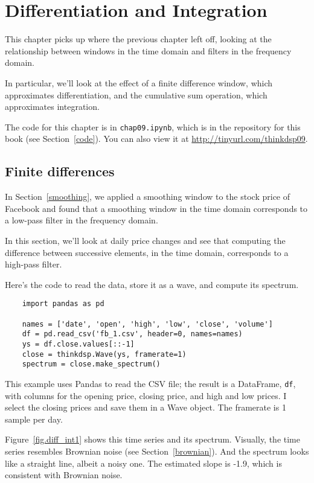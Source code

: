 \chapter{Differentiation and Integration}
\label{diffint}

This chapter picks up where the previous chapter left off,
looking at the relationship between windows in the time domain
and filters in the frequency domain.

In particular, we'll look at the effect of a finite difference
window, which approximates differentiation, and the cumulative
sum operation, which approximates integration.

The code for this chapter is in {\tt chap09.ipynb}, which is in the
repository for this book (see Section~\ref{code}).
You can also view it at \url{http://tinyurl.com/thinkdsp09}.


\section{Finite differences}
\label{diffs}

In Section~\ref{smoothing}, we applied a smoothing window to
the stock price of Facebook and found that a smoothing
window in the time domain corresponds to a low-pass filter in
the frequency domain.

In this section, we'll look at daily price changes and
see that computing the difference between successive elements,
in the time domain, corresponds to a high-pass filter.

Here's the code to read the data, store it as a wave, and compute its
spectrum.

\begin{verbatim}
	import pandas as pd
	
	names = ['date', 'open', 'high', 'low', 'close', 'volume']
	df = pd.read_csv('fb_1.csv', header=0, names=names)
	ys = df.close.values[::-1]
	close = thinkdsp.Wave(ys, framerate=1)
	spectrum = close.make_spectrum()
\end{verbatim}

This example uses Pandas to read the CSV file; the
result is a DataFrame, {\tt df}, with columns for the opening
price, closing price, and high and low prices.  I select the closing
prices and save them in a Wave object.
The framerate is 1 sample per day.

Figure~\ref{fig.diff_int1} shows
this time series and its spectrum.
Visually, the time series resembles Brownian noise (see
Section~\ref{brownian}).
And the spectrum looks like a straight
line, albeit a noisy one.  The estimated slope is -1.9,
which is consistent with Brownian noise.

